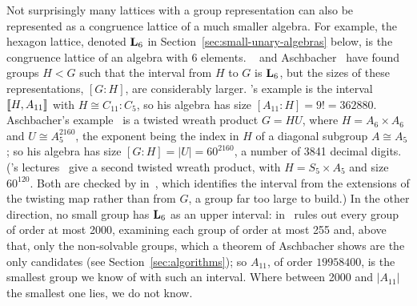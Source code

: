 Not surprisingly many lattices with a group representation
can also be represented as a congruence lattice of a much smaller
algebra. For example, the hexagon lattice, denoted $\mathbf{L}_6$ in
Section~\ref{sec:small-unary-algebras} below, is the congruence lattice
of an algebra with 6 elements. \Palfy~\cite{Palfy1988} and
Aschbacher~\cite{Aschbacher2008} have found groups
$H < G$ such that the interval from $H$ to $G$ is $\mathbf{L}_6$, but
the sizes of these representations, $[G : H]$, are considerably larger.
\Palfy's example is the interval $\llbracket H, A_{11}\rrbracket$ with $H \cong C_{11} : C_5$,
so his algebra has size $[A_{11} : H] = 9! = 362880$.
Aschbacher's example~\cite[Example~8.5]{Aschbacher2008} is a twisted wreath
product $G = HU$, where $H = A_6 \times A_6$ and $U \cong A_5^{2160}$,
the exponent being the index in $H$ of a diagonal subgroup $A \cong A_5$;
so his algebra has size $[G : H] = |U| = 60^{2160}$, a number of 3841
decimal digits.  (\Palfy's lectures~\cite{Palfy:2009} give a second twisted
wreath product, with $H = S_5 \times A_5$ and size $60^{120}$.  Both are
checked by  in~\cite{finlatrepgap}, which
identifies the interval from the extensions of the twisting map rather than
from $G$, a group far too large to build.)
In the other direction, no small group has $\mathbf{L}_6$ as an upper interval:
 in~\cite{finlatrepgap} rules out every group of
order at most 2000, examining each group of order at most 255 and, above
that, only the non-solvable groups, which a theorem of Aschbacher shows
are the only candidates (see Section~\ref{sec:algorithms}); so
$A_{11}$, of order $19958400$, is the smallest group we know of with such
an interval.  Where between 2000 and $|A_{11}|$ the smallest one lies, we
do not know.

